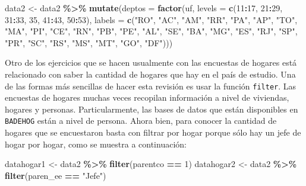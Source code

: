 \documentclass[
  spanish,
  12pt,
]{book}
\newenvironment{Shaded}{\begin{snugshade}}{\end{snugshade}}
\newcommand{\AttributeTok}[1]{\textcolor[rgb]{0.13,0.29,0.53}{#1}}
\newcommand{\DecValTok}[1]{\textcolor[rgb]{0.00,0.00,0.81}{#1}}
\newcommand{\FunctionTok}[1]{\textcolor[rgb]{0.13,0.29,0.53}{\textbf{#1}}}
\newcommand{\NormalTok}[1]{#1}
\newcommand{\OtherTok}[1]{\textcolor[rgb]{0.56,0.35,0.01}{#1}}
\newcommand{\SpecialCharTok}[1]{\textcolor[rgb]{0.81,0.36,0.00}{\textbf{#1}}}
\newcommand{\StringTok}[1]{\textcolor[rgb]{0.31,0.60,0.02}{#1}}
\begin{document}
\begin{Shaded}
\begin{Highlighting}[]
\NormalTok{data2 }\OtherTok{\textless{}{-}}\NormalTok{ data2 }\SpecialCharTok{\%\textgreater{}\%} 
         \FunctionTok{mutate}\NormalTok{(}\AttributeTok{deptos =} \FunctionTok{factor}\NormalTok{(uf, }
                \AttributeTok{levels =} \FunctionTok{c}\NormalTok{(}\DecValTok{11}\SpecialCharTok{:}\DecValTok{17}\NormalTok{, }\DecValTok{21}\SpecialCharTok{:}\DecValTok{29}\NormalTok{, }\DecValTok{31}\SpecialCharTok{:}\DecValTok{33}\NormalTok{, }\DecValTok{35}\NormalTok{, }\DecValTok{41}\SpecialCharTok{:}\DecValTok{43}\NormalTok{, }\DecValTok{50}\SpecialCharTok{:}\DecValTok{53}\NormalTok{), }
                \AttributeTok{labels =} \FunctionTok{c}\NormalTok{(}\StringTok{"RO"}\NormalTok{, }\StringTok{"AC"}\NormalTok{, }\StringTok{"AM"}\NormalTok{, }\StringTok{"RR"}\NormalTok{, }\StringTok{"PA"}\NormalTok{, }
                \StringTok{"AP"}\NormalTok{, }\StringTok{"TO"}\NormalTok{, }\StringTok{"MA"}\NormalTok{, }\StringTok{"PI"}\NormalTok{, }\StringTok{"CE"}\NormalTok{, }\StringTok{"RN"}\NormalTok{, }\StringTok{"PB"}\NormalTok{, }
                \StringTok{"PE"}\NormalTok{, }\StringTok{"AL"}\NormalTok{, }\StringTok{"SE"}\NormalTok{, }\StringTok{"BA"}\NormalTok{, }\StringTok{"MG"}\NormalTok{, }\StringTok{"ES"}\NormalTok{, }\StringTok{"RJ"}\NormalTok{, }\StringTok{"SP"}\NormalTok{,}
                \StringTok{"PR"}\NormalTok{, }\StringTok{"SC"}\NormalTok{, }\StringTok{"RS"}\NormalTok{, }\StringTok{"MS"}\NormalTok{, }\StringTok{"MT"}\NormalTok{, }\StringTok{"GO"}\NormalTok{, }\StringTok{"DF"}\NormalTok{)))}
\end{Highlighting}
\end{Shaded}

Otro de los ejercicios que se hacen usualmente con las encuestas de hogares está relacionado con saber la cantidad de hogares que hay en el país de estudio. Una de las formas más sencillas de hacer esta revisión es usar la función \texttt{filter}. Las encuestas de hogares muchas veces recopilan información a nivel de viviendas, hogares y personas. Particularmente, las bases de datos que están disponibles en \texttt{BADEHOG} están a nivel de persona. Ahora bien, para conocer la cantidad de hogares que se encuestaron basta con filtrar por hogar porque sólo hay un jefe de hogar por hogar, como se muestra a continuación:

\begin{Shaded}
\begin{Highlighting}[]
\NormalTok{datahogar1 }\OtherTok{\textless{}{-}}\NormalTok{ data2 }\SpecialCharTok{\%\textgreater{}\%} \FunctionTok{filter}\NormalTok{(parentco }\SpecialCharTok{==} \DecValTok{1}\NormalTok{)}
\NormalTok{datahogar2 }\OtherTok{\textless{}{-}}\NormalTok{ data2 }\SpecialCharTok{\%\textgreater{}\%} \FunctionTok{filter}\NormalTok{(paren\_ee }\SpecialCharTok{==} \StringTok{"Jefe"}\NormalTok{) }
\end{Highlighting}
\end{Shaded}
\end{document}
